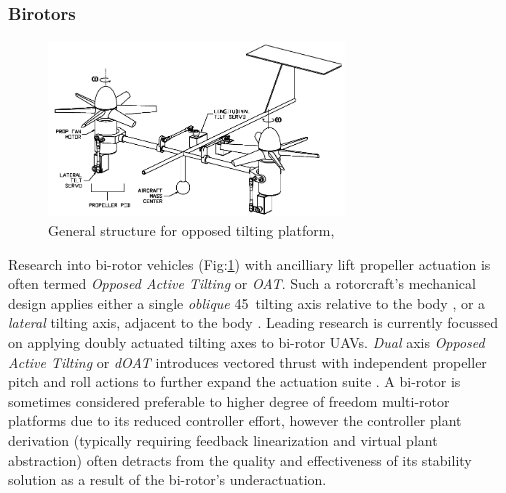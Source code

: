\subsubsection*{Birotors}
\begin{figure}[hbtp]
\centering
\includegraphics[width=0.7\textwidth]{figs/dualaxistilt}
\caption{General structure for opposed tilting platform, \cite{gres2007}}
\label{fig:dualaxistilt}
\end{figure}
Research into bi-rotor vehicles (Fig:\ref{fig:dualaxistilt}) with ancilliary lift propeller actuation is often termed \emph{Opposed Active Tilting} or \emph{OAT}. Such a rotorcraft's mechanical design applies either a single \emph{oblique} 45\textdegree ~tilting axis relative to the body \cite{smalltwotilting,obliquepitch}, or a \emph{lateral} tilting axis, adjacent to the body \cite{tiltrotorUAV,adaptivebackstep,tiltrotorcontrol,tpheonix}. Leading research is currently focussed on applying doubly actuated tilting axes to bi-rotor UAVs. \emph{Dual} axis \emph{Opposed Active Tilting} or \emph{dOAT} introduces vectored thrust with independent propeller pitch and roll actions to further expand the actuation suite \cite{gres2007,opposedlateraldualaxis}. A bi-rotor is sometimes considered preferable to higher degree of freedom multi-rotor platforms due to its reduced controller effort, however the controller plant derivation (typically requiring feedback linearization and virtual plant abstraction) often detracts from the quality and effectiveness of its stability solution as a result of the bi-rotor's underactuation. 
\par
